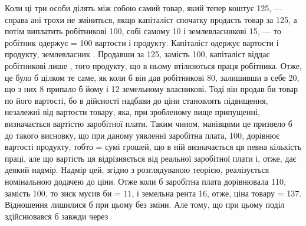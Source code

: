 Коли ці три особи ділять між собою самий товар, який тепер коштує
125, — справа ані трохи не зміниться, якщо капіталіст спочатку продасть
товар за 125, а потім виплатить робітникові 100, собі самому 10 і землевласникові
15, — то робітник одержує  = 100 вартости і продукту. Капіталіст
одержує  вартости і продукту, землевласник . Продавши за 125, замість
100, капіталіст віддає робітникові лише , того продукту, що в ньому втілюються
праця робітника. Отже, це було б цілком те саме, як коли б він дав
робітникові 80, залишивши в себе 20, що з них 8 припало б йому і 12 земельному
власникові. Тоді він продав би товар по його вартості, бо в дійсності
надбави до ціни становлять підвищення, незалежні від вартости товару, яка, при
зробленому вище припущенні, визначається вартістю заробітної плати. Таким
чином, манівцями це призвело б до такого висновку, що при даному уявленні
заробітна плата, 100, дорівнює вартості продукту, тобто = сумі грошей, що в
ній визначається ця певна кількість праці, але що вартість ця відрізняється від
реальної заробітної плати і, отже, дає деякий надмір. Надмір цей, згідно з розглядуваною
теорією, реалізується номінальною додачею до ціни. Отже коли б
заробітна плата дорівнювала 110, замість 100, то зиск мусив би = 11, і земельна
рента 16, отже, ціна товару = 137. Відношення лишилися б при
цьому без зміни. Але тому, що при цьому поділ здійснювався б завжди через
\parbreak{}  %
